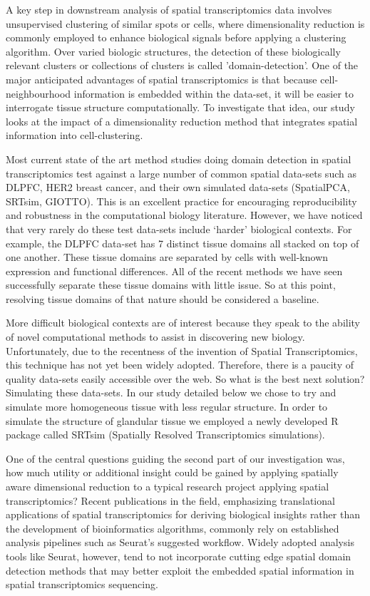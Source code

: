 \documentclass{article}
\begin{document}
A key step in downstream analysis of spatial transcriptomics data involves unsupervised clustering of similar spots or cells, where dimensionality reduction is commonly employed to enhance biological signals before applying a clustering algorithm. Over varied biologic structures, the detection of these biologically relevant clusters or collections of clusters is called 'domain-detection'. One of the major anticipated advantages of spatial transcriptomics is that because cell-neighbourhood information is embedded within the data-set, it will be easier to interrogate tissue structure computationally. To investigate that idea, our study looks at the impact of a dimensionality reduction method that integrates spatial information into cell-clustering.

Most current state of the art method studies doing domain detection in spatial transcriptomics test against a large number of common spatial data-sets such as DLPFC\citep{maynard_transcriptomescale_2021}, HER2 breast cancer\citep{wu_stromal_2020}, and their own simulated data-sets (SpatialPCA\citep{shang2022}, SRTsim\citep{zhu_srtsim_2023}, GIOTTO\citep{dries_giotto_2021}). This is an excellent practice for encouraging reproducibility and robustness in the computational biology literature. However, we have noticed that very rarely do these test data-sets include `harder' biological contexts. For example, the DLPFC data-set has 7 distinct tissue domains all stacked on top of one another. These tissue domains are separated by cells with well-known expression and functional differences. All of the recent methods we have seen successfully separate these tissue domains with little issue. So at this point, resolving tissue domains of that nature should be considered a baseline.

More difficult biological contexts are of interest because they speak to the ability of novel computational methods to assist in discovering new biology. Unfortunately, due to the recentness of the invention of Spatial Transcriptomics, this technique has not yet been widely adopted. Therefore, there is a paucity of quality data-sets easily accessible over the web. So what is the best next solution? Simulating these data-sets. In our study detailed below we chose to try and simulate more homogeneous tissue with less regular structure. In order to simulate the structure of glandular tissue we employed a newly developed R package called SRTsim (Spatially Resolved Transcriptomics simulations).

One of the central questions guiding the second part of our investigation was, how much utility or additional insight could be gained by applying spatially aware dimensional reduction to a typical research project applying spatial transcriptomics? Recent publications in the field, emphasizing translational applications of spatial transcriptomics for deriving biological insights rather than the development of bioinformatics algorithms, commonly rely on established analysis pipelines such as Seurat's\citep{hao2021} suggested workflow. Widely adopted analysis tools like Seurat, however, tend to not incorporate cutting edge spatial domain detection methods that may better exploit the embedded spatial information in spatial transcriptomics sequencing.
\end{document}
